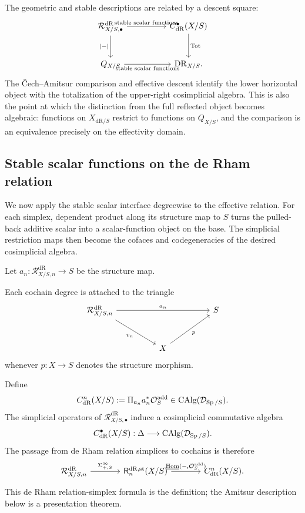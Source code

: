 The geometric and stable descriptions are related by a descent square:
\[
\begin{tikzcd}[column sep=huge,row sep=large]
  \mathcal R^{\mathrm{dR}}_{X/S,\bullet}
      \arrow[r,"\text{stable scalar functions}"]
      \arrow[d,"\lvert-\rvert"']
  &
  C^\bullet_{\mathrm{dR}}(X/S)
      \arrow[d,"\operatorname*{Tot}"]
  \\
  Q_{X/S}
      \arrow[r,"\text{stable scalar functions}"']
  &
  \mathrm{DR}_{X/S}.
\end{tikzcd}
\]
The \v{C}ech--Amitsur comparison and effective descent identify the lower
horizontal object with the totalization of the upper-right cosimplicial
algebra. This is also the point
at which the distinction from the full reflected object becomes algebraic:
functions on \(X_{\mathrm{dR}/S}\) restrict to functions on \(Q_{X/S}\), and
the comparison is an equivalence precisely on the effectivity domain.
\subsection{Stable scalar functions on the de Rham relation}
\label{sec:infinitesimal-cochains}

We now apply the stable scalar interface degreewise to the effective relation.
For each simplex, dependent product along its structure map to \(S\) turns the
pulled-back additive scalar into a scalar-function object on the base. The
simplicial restriction maps then become the cofaces and codegeneracies of the
desired cosimplicial algebra.

Let \(a_n:\mathcal R^{\mathrm{dR}}_{X/S,n}\to S\) be the structure map.

Each cochain degree is attached to the triangle
\[
\begin{tikzcd}[column sep=huge,row sep=large]
  \mathcal R^{\mathrm{dR}}_{X/S,n}
    \arrow[rr,"a_n"]
    \arrow[dr,"v_n"']
  &&
  S
  \\
  &
  X
    \arrow[ur,"p"']
  &
\end{tikzcd}
\]
whenever \(p:X\to S\) denotes the structure morphism.

\begin{definition}
Define
\[
  C^n_{\mathrm{dR}}(X/S)
  :=
  \Pi_{a_n}a_n^*\mathcal O_S^{\mathrm{add}}
  \in
  \operatorname{CAlg}(\mathcal D_{\operatorname{Sp}/S}).
\]
The simplicial operators of \(\mathcal R^{\mathrm{dR}}_{X/S,\bullet}\) induce a
cosimplicial commutative algebra
\[
  C^\bullet_{\mathrm{dR}}(X/S):
  \Delta\longrightarrow\operatorname{CAlg}(\mathcal D_{\operatorname{Sp}/S}).
\]
The passage from de Rham relation simplices to cochains is therefore
\[
\begin{tikzcd}[column sep=large]
  \mathcal R^{\mathrm{dR}}_{X/S,n}
    \arrow[r,"{\Sigma^\infty_{+,S}}"]
  &
  \mathsf{R}^{\mathrm{dR},\mathrm{st}}_n(X/S)
    \arrow[r,"{\HHom(-,\mathcal O_S^{\mathrm{add}})}"]
  &
  C^n_{\mathrm{dR}}(X/S).
\end{tikzcd}
\]
This de Rham relation-simplex formula is the definition; the Amitsur description below is a
presentation theorem.
\end{definition}

